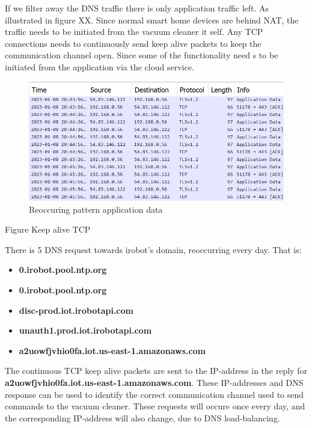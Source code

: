 If we filter away the DNS traffic there is only application traffic left. As illustrated in figure XX. Since normal smart home devices are behind NAT, the traffic needs to be initiated from the vacuum cleaner it self. Any TCP connections needs to continuously send keep alive packets to keep the communication channel open. Since some of the functionality need s to be initiated from the application via the cloud service. 

\begin{figure}[!ht]
    \centering
    \includegraphics[width=\textwidth]{figures/Wireshark_standby_noDNS.png}
    \caption{Reoccuring pattern application data}
    \label{fig:SBnDNS}
\end{figure}

Figure Keep alive TCP

There is 5 DNS request towards irobot's domain, reoccurring every day. That is: 
\begin{itemize}
    \item \textbf{0.irobot.pool.ntp.org}
    \item \textbf{0.irobot.pool.ntp.org}
    \item \textbf{disc-prod.iot.irobotapi.com}
    \item \textbf{unauth1.prod.iot.irobotapi.com}
    \item \textbf{a2uowfjvhio0fa.iot.us-east-1.amazonaws.com}
\end{itemize}

The continuous TCP keep alive packets are sent to the IP-address in the reply for \textbf{a2uowfjvhio0fa.iot.us-east-1.amazonaws.com}. These IP-addresses and DNS response can be used to identify the correct communication channel used to send commands to the vacuum cleaner. These requests will occure once every day, and the corresponding IP-address will also change, due to DNS load-balancing. 